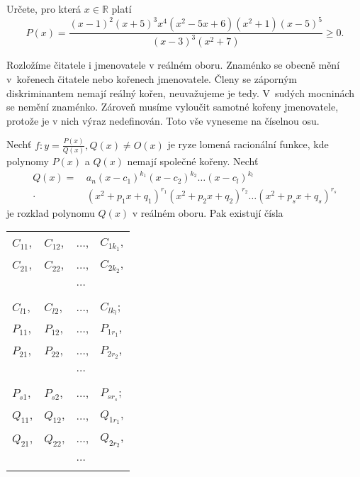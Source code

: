 \begin{priklad}
  Určete, pro která $x \in \mathbb R$ platí
  $$P(x) = \frac{(x-1)^2(x+5)^3x^4(x^2-5x+6)(x^2+1)(x-5)^5}{(x-3)^3(x^2+7)} \geq 0.$$
\end{priklad}

\begin{reseni}
  Rozložíme čitatele i jmenovatele v reálném oboru. Znaménko se obecně mění v~kořenech čitatele nebo kořenech jmenovatele. Členy se záporným diskriminantem nemají reálný kořen,
  neuvažujeme je tedy. V~sudých mocninách se nemění znaménko. Zároveň musíme vyloučit samotné kořeny jmenovatele, protože je v nich výraz nedefinován. Toto vše vyneseme na číselnou osu.
\end{reseni}

\begin{veta}
    Nechť $f: y=\frac{P(x)}{Q(x)}, Q(x) \ne O(x)$ je ryze lomená
    racionální funkce, kde polynomy $P(x)$ a $Q(x)$ nemají společné
    kořeny. Nechť
    \begin{align*}
        Q(x) = & \, a_n(x-c_1)^{k_1}(x-c_2)^{k_2} \dots
        (x-c_l)^{k_l} \\
        \cdot & \, (x^2+p_1x + q_1)^{r_1}(x^2+p_2x+q_2)
        ^{r_2} \dots (x^2+p_sx+q_s)^{r_s}
    \end{align*}
    je rozklad polynomu $Q(x)$ v reálném oboru. Pak existují čísla
    \begin{center}
        \begin{tabular}{l l l l}
            $C_{11}$, & $C_{12}$, & $\dots$, & $C_{1k_1}$, \\
            $C_{21}$, & $C_{22}$, & $\dots$, & $C_{2k_2}$, \\
            \,        & \,        & $\dots$  & \,          \\
            $C_{l1}$, & $C_{l2}$, & $\dots$, & $C_{lk_l}$; \\
            $P_{11}$, & $P_{12}$, & $\dots$, & $P_{1r_1}$, \\
            $P_{21}$, & $P_{22}$, & $\dots$, & $P_{2r_2}$, \\
            \,        & \,        & $\dots$  & \,          \\
            $P_{s1}$, & $P_{s2}$, & $\dots$, & $P_{sr_s}$; \\
            $Q_{11}$, & $Q_{12}$, & $\dots$, & $Q_{1r_1}$, \\
            $Q_{21}$, & $Q_{22}$, & $\dots$, & $Q_{2r_2}$, \\
            \,        & \,        & $\dots$  & \,          \\

\end{tabular}
\end{center}
\end{veta}
